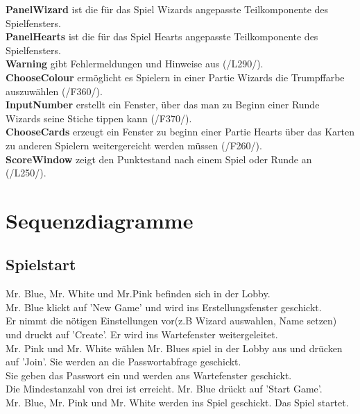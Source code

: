 \documentclass{article}
\begin{document}
			\textbf{PanelWizard} ist die für das Spiel Wizards angepasste Teilkomponente des Spielfensters.  \\
			\textbf{PanelHearts} ist die für das Spiel Hearts angepasste Teilkomponente des Spielfensters. \\
			\textbf{Warning} gibt Fehlermeldungen und Hinweise aus (/L290/). \\
			\textbf{ChooseColour} ermöglicht es Spielern in einer Partie Wizards die Trumpffarbe auszuwählen (/F360/). \\
			\textbf{InputNumber} erstellt ein Fenster, über das man zu Beginn einer Runde Wizards seine Stiche tippen kann (/F370/). \\
			\textbf{ChooseCards} erzeugt ein Fenster zu beginn einer Partie Hearts über das Karten zu anderen Spielern weitergereicht werden müssen (/F260/). \\
			\textbf{ScoreWindow} zeigt den Punktestand nach einem Spiel oder Runde an (/L250/).\\

\section{Sequenzdiagramme}
	\subsection{Spielstart}
		Mr. Blue, Mr. White und Mr.Pink befinden sich in der Lobby. \\
		Mr. Blue klickt auf 'New Game' und wird ins Erstellungsfenster geschickt. \\
		Er nimmt die nötigen Einstellungen vor(z.B Wizard auswahlen, Name setzen) und druckt auf 'Create'. Er wird ins  Wartefenster weitergeleitet.\\
		Mr. Pink und Mr. White wählen Mr. Blues spiel in der Lobby aus und drücken auf 'Join'. Sie werden an die Passwortabfrage geschickt.\\
		Sie geben das Passwort ein und werden ans Wartefenster geschickt.\\
		Die Mindestanzahl von drei ist erreicht. Mr. Blue drückt auf 'Start Game'.\\
		Mr. Blue, Mr. Pink und Mr. White werden ins Spiel geschickt. Das Spiel startet.\\
\end{document}
